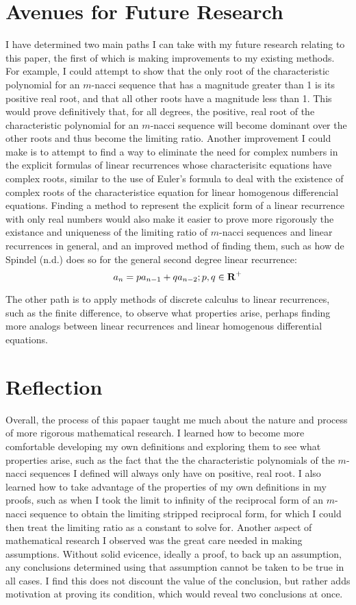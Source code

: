 \documentclass[11pt]{article}
\begin{document}
\section{Avenues for Future Research}
    I have determined two main paths I can take with my future research relating to this paper, the first of which is making improvements to my existing methods. For example, I could attempt to show that the only root of the characteristic polynomial for an \(m\)-nacci sequence that has a magnitude greater than 1 is its positive real root, and that all other roots have a magnitude less than 1. This would prove definitively that, for all degrees, the positive, real root of the characteristic polynomial for an \(m\)-nacci sequence will become dominant over the other roots and thus become the limiting ratio. 
Another improvement I could make is to attempt to find a way to eliminate the need for complex numbers in the explicit formulas of linear recurrences whose characterisitc equations have complex roots, similar to the use of Euler's formula to deal with the existence of complex roots of the characteristice equation for linear homogenous differencial equations. 
Finding a method to represent the explicit form of a linear recurrence with only real numbers would also make it easier to prove more rigorously the existance and uniqueness of the limiting ratio of \(m\)-nacci sequences and linear recurrences in general, and an improved method of finding them, such as how de Spindel (n.d.) does so for the general second degree linear recurrence:
\[a_n=pa_{n-1}+qa_{n-2}; p,q\in\mbox{\textbf{R}}^+\]

The other path is to apply methods of discrete calculus to linear recurrences, such as the finite difference, to observe what properties arise, perhaps finding more analogs between linear recurrences and linear homogenous differential equations.

\section{Reflection}
Overall, the process of this papaer taught me much about the nature and process of more rigorous mathematical research. I learned how to become more comfortable developing my own definitions and exploring them to see what properties arise, such as the fact that the the characteristic polynomials of the \(m\)-nacci sequences I defined will always only have on positive, real root. I also learned how to take advantage of the properties of my own definitions in my proofs, such as when I took the limit to infinity of the reciprocal form of an \(m\)-nacci sequence to obtain the limiting stripped reciprocal form, for which I could then treat the limiting ratio as a constant to solve for. 
Another aspect of mathematical research I observed was the great care needed in making assumptions. Without solid evicence, ideally a proof, to back up an assumption, any conclusions determined using that assumption cannot be taken to be true in all cases. I find this does not discount the value of the conclusion, but rather adds motivation at proving its condition, which would reveal two conclusions at once.
\end{document}
